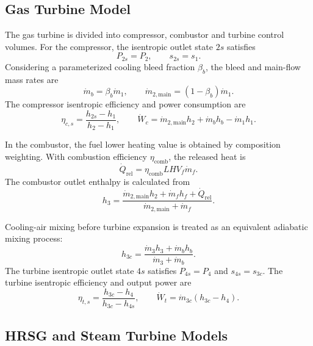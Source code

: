 \documentclass[12pt,a4paper]{article}
\begin{document}
\subsection{Gas Turbine Model}

The gas turbine is divided into compressor, combustor and turbine control volumes. For the compressor, the isentropic outlet state \(2s\) satisfies
\begin{equation}
P_{2s}=P_2,\qquad s_{2s}=s_1.
\end{equation}
Considering a parameterized cooling bleed fraction \(\beta_b\), the bleed and main-flow mass rates are
\begin{equation}
\dot{m}_b=\beta_b\dot{m}_1,\qquad
\dot{m}_{2,\mathrm{main}}=(1-\beta_b)\dot{m}_1.
\end{equation}
The compressor isentropic efficiency and power consumption are
\begin{equation}
\eta_{c,s}=\frac{h_{2s}-h_1}{h_2-h_1},
\qquad
\dot{W}_c=\dot{m}_{2,\mathrm{main}}h_2+\dot{m}_b h_b-\dot{m}_1h_1.
\label{eq:compressor}
\end{equation}

In the combustor, the fuel lower heating value is obtained by composition weighting. With combustion efficiency \(\eta_{\mathrm{comb}}\), the released heat is
\begin{equation}
\dot{Q}_{\mathrm{rel}}=\eta_{\mathrm{comb}} LHV_f \dot{m}_f.
\end{equation}
The combustor outlet enthalpy is calculated from
\begin{equation}
h_3=
\frac{\dot{m}_{2,\mathrm{main}}h_2+\dot{m}_f h_f+\dot{Q}_{\mathrm{rel}}}
{\dot{m}_{2,\mathrm{main}}+\dot{m}_f}.
\label{eq:combustor}
\end{equation}

Cooling-air mixing before turbine expansion is treated as an equivalent adiabatic mixing process:
\begin{equation}
h_{3c}=
\frac{\dot{m}_3 h_3+\dot{m}_b h_b}{\dot{m}_3+\dot{m}_b}.
\end{equation}
The turbine isentropic outlet state \(4s\) satisfies \(P_{4s}=P_4\) and \(s_{4s}=s_{3c}\). The turbine isentropic efficiency and output power are
\begin{equation}
\eta_{t,s}=\frac{h_{3c}-h_4}{h_{3c}-h_{4s}},
\qquad
\dot{W}_t=\dot{m}_{3c}(h_{3c}-h_4).
\label{eq:turbine}
\end{equation}

\subsection{HRSG and Steam Turbine Models}
\end{document}
